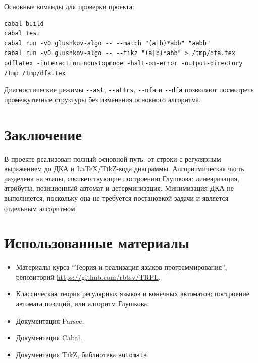 \documentclass[12pt,a4paper]{article}
\begin{document}
Основные команды для проверки проекта:
\begingroup
\footnotesize
\begin{verbatim}
cabal build
cabal test
cabal run -v0 glushkov-algo -- --match "(a|b)*abb" "aabb"
cabal run -v0 glushkov-algo -- --tikz "(a|b)*abb" > /tmp/dfa.tex
pdflatex -interaction=nonstopmode -halt-on-error -output-directory /tmp /tmp/dfa.tex
\end{verbatim}
\endgroup

Диагностические режимы \verb|--ast|, \verb|--attrs|, \verb|--nfa| и
\verb|--dfa| позволяют посмотреть промежуточные структуры без изменения
основного алгоритма.

\section{Заключение}

В проекте реализован полный основной путь: от строки с регулярным выражением до
ДКА и LaTeX/TikZ-кода диаграммы. Алгоритмическая часть разделена на этапы,
соответствующие построению Глушкова: линеаризация, атрибуты, позиционный
автомат и детерминизация. Минимизация ДКА не выполняется, поскольку она не
требуется постановкой задачи и является отдельным алгоритмом.

\section{Использованные материалы}

\begin{itemize}
  \item Материалы курса ``Теория и реализация языков программирования'',
  репозиторий \url{https://github.com/rbtsv/TRPL}.
  \item Классическая теория регулярных языков и конечных автоматов:
  построение автомата позиций, или алгоритм Глушкова.
  \item Документация Parsec.
  \item Документация Cabal.
  \item Документация TikZ, библиотека \verb|automata|.
\end{itemize}
\end{document}
